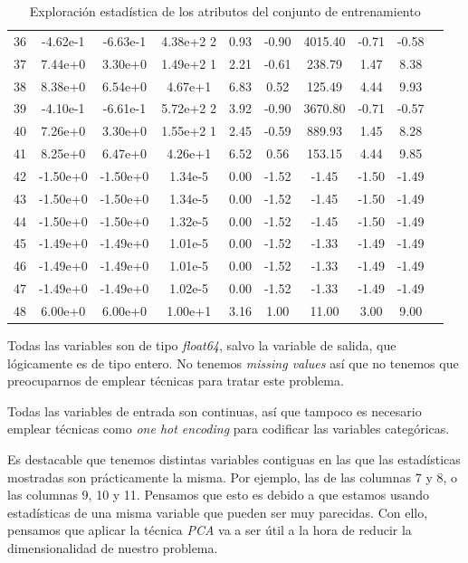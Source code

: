 \documentclass[11pt]{article}
\begin{document}
\begin{table}[H]
{\begin{tabular}{|c|c|c|c|c|c|c|c|c|c|}
36  & -4.62e-1 & -6.63e-1  & 4.38e+2  2& 0.93  & -0.90&   4015.40& -0.71&  -0.58 \\
37  &  7.44e+0 &  3.30e+0  & 1.49e+2  1& 2.21  & -0.61&    238.79&  1.47&   8.38 \\
38  &  8.38e+0 &  6.54e+0  & 4.67e+1   & 6.83  &  0.52&    125.49&  4.44&   9.93 \\
39  & -4.10e-1 & -6.61e-1  & 5.72e+2  2& 3.92  & -0.90&   3670.80& -0.71&  -0.57 \\
40  &  7.26e+0 &  3.30e+0  & 1.55e+2  1& 2.45  & -0.59&    889.93&  1.45&   8.28 \\
41  &  8.25e+0 &  6.47e+0  & 4.26e+1   & 6.52  &  0.56&    153.15&  4.44&   9.85 \\
42  & -1.50e+0 & -1.50e+0  & 1.34e-5   & 0.00  & -1.52&     -1.45& -1.50&  -1.49 \\
43  & -1.50e+0 & -1.50e+0  & 1.34e-5   & 0.00  & -1.52&     -1.45& -1.50&  -1.49 \\
44  & -1.50e+0 & -1.50e+0  & 1.32e-5   & 0.00  & -1.52&     -1.45& -1.50&  -1.49 \\
45  & -1.49e+0 & -1.49e+0  & 1.01e-5   & 0.00  & -1.52&     -1.33& -1.49&  -1.49 \\
46  & -1.49e+0 & -1.49e+0  & 1.01e-5   & 0.00  & -1.52&     -1.33& -1.49&  -1.49 \\
47  & -1.49e+0 & -1.49e+0  & 1.02e-5   & 0.00  & -1.52&     -1.33& -1.49&  -1.49 \\
48  &  6.00e+0 &  6.00e+0  & 1.00e+1   & 3.16  &  1.00&     11.00&  3.00&   9.00 \\
\hline
\end{tabular}}
    \caption{Exploración estadística de los atributos del conjunto de entrenamiento}
    \label{variables_clasificacion}
\end{table}

Todas las variables son de tipo \emph{float64}, salvo la variable de salida, que lógicamente es de tipo entero. No tenemos \emph{missing values} así que no tenemos que preocuparnos de emplear técnicas para tratar este problema.

Todas las variables de entrada son continuas, así que tampoco es necesario emplear técnicas como \emph{one hot encoding} para codificar las variables categóricas.

Es destacable que tenemos distintas variables contiguas en las que las estadísticas mostradas son prácticamente la misma. Por ejemplo, las de las columnas 7 y 8, o las columnas 9, 10 y 11. Pensamos que esto es debido a que estamos usando estadísticas de una misma variable que pueden ser muy parecidas. Con ello, pensamos que aplicar la técnica \emph{PCA} va a ser útil a la hora de reducir la dimensionalidad de nuestro problema.
\end{document}
